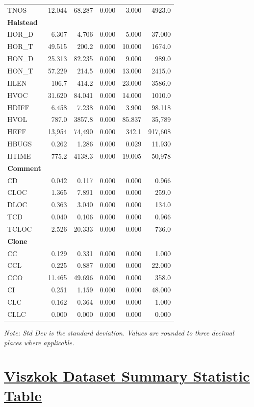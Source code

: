 \begin{longtable}{@{}lrrrrr@{}}
TNOS & 12.044 & 68.287 & 0.000 & 3.000 & 4923.0 \\
\addlinespace
\textbf{Halstead} & & & & & \\
HOR\_D & 6.307 & 4.706 & 0.000 & 5.000 & 37.000 \\
HOR\_T & 49.515 & 200.2 & 0.000 & 10.000 & 1674.0 \\
HON\_D & 25.313 & 82.235 & 0.000 & 9.000 & 989.0 \\
HON\_T & 57.229 & 214.5 & 0.000 & 13.000 & 2415.0 \\
HLEN & 106.7 & 414.2 & 0.000 & 23.000 & 3586.0 \\
HVOC & 31.620 & 84.041 & 0.000 & 14.000 & 1010.0 \\
HDIFF & 6.458 & 7.238 & 0.000 & 3.900 & 98.118 \\
HVOL & 787.0 & 3857.8 & 0.000 & 85.837 & 35,789 \\
HEFF & 13,954 & 74,490 & 0.000 & 342.1 & 917,608 \\
HBUGS & 0.262 & 1.286 & 0.000 & 0.029 & 11.930 \\
HTIME & 775.2 & 4138.3 & 0.000 & 19.005 & 50,978 \\
\addlinespace
\textbf{Comment} & & & & & \\
CD & 0.042 & 0.117 & 0.000 & 0.000 & 0.966 \\
CLOC & 1.365 & 7.891 & 0.000 & 0.000 & 259.0 \\
DLOC & 0.363 & 3.040 & 0.000 & 0.000 & 134.0 \\
TCD & 0.040 & 0.106 & 0.000 & 0.000 & 0.966 \\
TCLOC & 2.526 & 20.333 & 0.000 & 0.000 & 736.0 \\
\addlinespace
\textbf{Clone} & & & & & \\
CC & 0.129 & 0.331 & 0.000 & 0.000 & 1.000 \\
CCL & 0.225 & 0.887 & 0.000 & 0.000 & 22.000 \\
CCO & 11.465 & 49.696 & 0.000 & 0.000 & 358.0 \\
CI & 0.251 & 1.159 & 0.000 & 0.000 & 48.000 \\
CLC & 0.162 & 0.364 & 0.000 & 0.000 & 1.000 \\
CLLC & 0.000 & 0.000 & 0.000 & 0.000 & 0.000 \\
\end{longtable}
\normalsize

\noindent\textit{Note: Std Dev is the standard deviation. Values are rounded to three decimal places where applicable.}

\section[Viszkok Dataset Summary Statistic Table]{\href{https://zenodo.org/records/4590021}{Viszkok Dataset Summary Statistic Table}}

